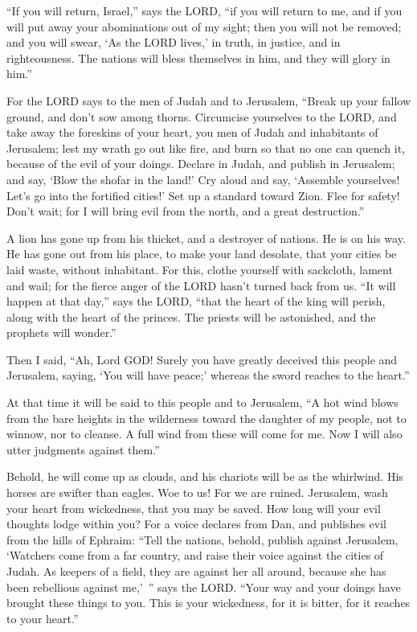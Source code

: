 \mychapter{} \myverse*{}“If you will return, Israel,” says the LORD, “if you will return to me, and if you will put away your abominations out of my sight; then you will not be removed; \myverse{}and you will swear, ‘As the LORD lives,’ in truth, in justice, and in righteousness. The nations will bless themselves in him, and they will glory in him.”


\myverse{}For the LORD says to the men of Judah and to Jerusalem, “Break up your fallow ground, and don’t sow among thorns. \myverse{}Circumcise yourselves to the LORD, and take away the foreskins of your heart, you men of Judah and inhabitants of Jerusalem; lest my wrath go out like fire, and burn so that no one can quench it, because of the evil of your doings. \myverse{}Declare in Judah, and publish in Jerusalem; and say, ‘Blow the shofar in the land!’ Cry aloud and say, ‘Assemble yourselves! Let’s go into the fortified cities!’ \myverse{}Set up a standard toward Zion. Flee for safety! Don’t wait; for I will bring evil from the north, and a great destruction.”


\myverse{}A lion has gone up from his thicket, and a destroyer of nations. He is on his way. He has gone out from his place, to make your land desolate, that your cities be laid waste, without inhabitant. \myverse{}For this, clothe yourself with sackcloth, lament and wail; for the fierce anger of the LORD hasn’t turned back from us. \myverse{}“It will happen at that day,” says the LORD, “that the heart of the king will perish, along with the heart of the princes. The priests will be astonished, and the prophets will wonder.”


\myverse{}Then I said, “Ah, Lord GOD! Surely you have greatly deceived
this people and Jerusalem, saying, ‘You will have peace;’ whereas the sword reaches to the heart.”


\myverse{}At that time it will be said to this people and to Jerusalem, “A hot wind blows from the bare heights in the wilderness toward the daughter of my people, not to winnow, nor to cleanse. \myverse{}A full wind from these will come for me. Now I will also utter judgments against them.”


\myverse{}Behold, he will come up as clouds, and his chariots will be as the whirlwind. His horses are swifter than eagles. Woe to us! For we are ruined. \myverse{}Jerusalem, wash your heart from wickedness, that you may be saved. How long will your evil thoughts lodge within you? \myverse{}For a voice declares from Dan, and publishes evil from the hills of Ephraim: \myverse{}“Tell the nations, behold, publish against Jerusalem, ‘Watchers come from a far country, and raise their voice against the cities of Judah. \myverse{}As keepers of a field, they are against her all around, because she has been rebellious against me,’ ” says the LORD. \myverse{}“Your way and your doings have brought these things to you. This is your wickedness, for it is bitter, for it reaches to your heart.”


